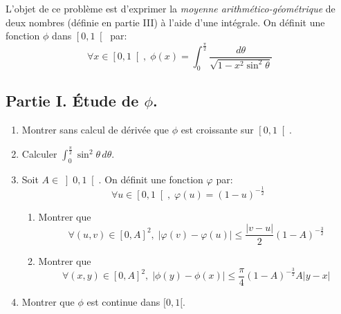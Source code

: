 L'objet de ce problème est d'exprimer la \emph{moyenne arithmético-géométrique} de deux nombres (définie en partie III) à l'aide d'une intégrale.\newline 
On définit une fonction $\phi$ dans $\left[ 0,1\right[ $ par:
\begin{displaymath}
\forall x\in \left[ 0,1\right[, \;  \phi (x)=\int_{0}^{\frac{\pi }{2}}\frac{d\theta}{\sqrt{1-x^{2}\sin ^{2}\theta}}
\end{displaymath}

\subsection*{Partie I. \'Etude de $\phi$.}
\begin{enumerate}
  \item  Montrer sans calcul de d{\'e}riv{\'e}e que $\phi $ est croissante sur $\left[ 0,1\right[$.
  \item Calculer $\int_{0}^{\frac{\pi}{2}}\sin^2\theta\, d\theta$.
  \item Soit $A\in \left] 0,1\right[$. On définit une fonction $\varphi$ par:
\begin{displaymath}
\forall u \in \left[0,1 \right[,\; \varphi(u) = (1-u)^{-\frac{1}{2}}   
\end{displaymath}
\begin{enumerate}
  \item Montrer que
\begin{displaymath}
\forall (u,v)\in \left[ 0,A\right]^2, \; \left|\varphi(v) - \varphi(u)\right| \leq \frac{|v-u|}{2}(1-A)^{-\frac{3}{2}}   
\end{displaymath}
  \item Montrer que 
\begin{displaymath}
\forall (x,y)\in \left[ 0,A\right]^2, \; \left|\phi(y) - \phi(x)\right| \leq \frac{\pi}{4}(1-A)^{-\frac{3}{2}}A|y-x|  
\end{displaymath}
\end{enumerate}

\item Montrer que $\phi$ est continue dans $[0,1[$.
\end{enumerate}


